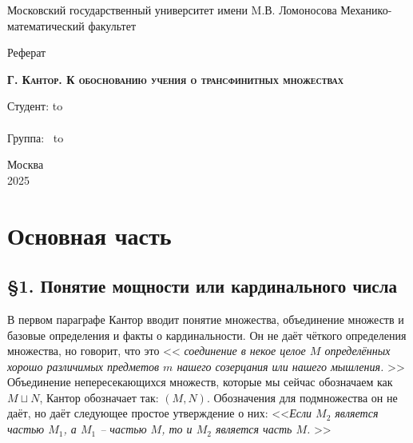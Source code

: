 \documentclass[a4paper,12pt]{extarticle}
\author{Борисенков Никита}
\theoremstyle{definition}
\newcommand{\cit}[1]{<<\textit{#1}>>}
\begin{document}
\begin{titlepage}
    \newpage
    \begin{center}
        Московский государственный университет имени M.В. Ломоносова
        Механико-математический факультет\\
    \end{center}

    \vspace{8em}

    \begin{center}
        \Large Реферат\\
    \end{center}

    \vspace{2em}

    \begin{center}
        \textsc{\textbf{Г. Кантор. К обоснованию учения о трансфинитных множествах}}
    \end{center}

    \vspace{20em}



    \newbox{\lbox}
    \newlength{\maxl}
    \setlength{\maxl}{\wd\lbox}
    \hfill\parbox{13cm}{
        \hspace*{5cm}\hspace*{-5cm}Студент: \qquad\qquad\hbox to \\
        \\
        \hspace*{5cm}\hspace*{-5cm}Группа:\qquad\qquad $\;\:$ \hbox to\\
    }


    \vspace{\fill}

    \begin{center}
        Москва \\2025
    \end{center}

\end{titlepage}
\newpage

\section{Основная часть}
\subsection{\S 1. Понятие мощности или кардинального числа}
В первом параграфе Кантор вводит понятие множества, объединение множеств и базовые определения и факты о кардинальности.
Он не даёт чёткого определения множества, но говорит, что это \cit{
соединение в некое целое $M$ определённых хорошо различимых предметов $m$ нашего созерцания или нашего мышления.
}
Объединение непересекающихся множеств, которые мы сейчас обозначаем как $M \sqcup N$, Кантор обозначает так: $(M, N)$.
Обозначения для подмножества он не даёт, но даёт следующее простое утверждение о них:
\cit{Если $M_2$ является частью $M_1$, а $M_1$ -- частью $M$, то и $M_2$ является часть $M$.
}
\end{document}
